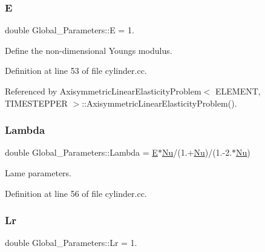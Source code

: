 \subsubsection{\texorpdfstring{E}{E}}
{\footnotesize\ttfamily double Global\+\_\+\+Parameters\+::E = 1.}



Define the non-\/dimensional Young\textquotesingle{}s modulus. 



Definition at line 53 of file cylinder.\+cc.



Referenced by Axisymmetric\+Linear\+Elasticity\+Problem$<$ E\+L\+E\+M\+E\+N\+T, T\+I\+M\+E\+S\+T\+E\+P\+P\+E\+R $>$\+::\+Axisymmetric\+Linear\+Elasticity\+Problem().

\mbox{\label{namespaceGlobal__Parameters_ae2f84a82174136947cce7a0d137097ae}} 
\subsubsection{\texorpdfstring{Lambda}{Lambda}}
{\footnotesize\ttfamily double Global\+\_\+\+Parameters\+::\+Lambda = \hyperlink{namespaceGlobal__Parameters_aa3dfbdb1b2fd80d516850f66c96b6fd0}{E}$\ast$\hyperlink{namespaceGlobal__Parameters_a20fccdcfa2c15ad8b951b9ada3bb1661}{Nu}/(1.+\hyperlink{namespaceGlobal__Parameters_a20fccdcfa2c15ad8b951b9ada3bb1661}{Nu})/(1.-\/2.$\ast$\hyperlink{namespaceGlobal__Parameters_a20fccdcfa2c15ad8b951b9ada3bb1661}{Nu})}



Lame parameters. 



Definition at line 56 of file cylinder.\+cc.

\mbox{\label{namespaceGlobal__Parameters_a444f5c911c8805ad2ba45ed8b1b8904e}} 
\subsubsection{\texorpdfstring{Lr}{Lr}}
{\footnotesize\ttfamily double Global\+\_\+\+Parameters\+::\+Lr = 1.}



